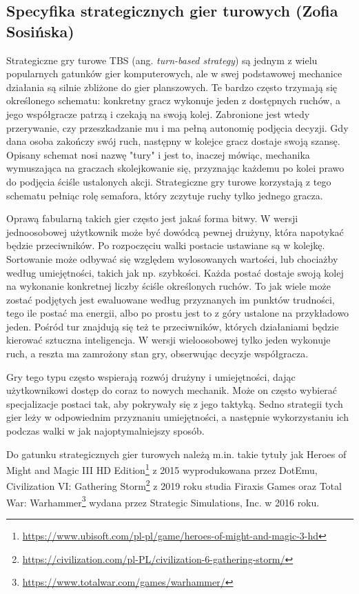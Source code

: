 \subsection{Specyfika strategicznych gier turowych (Zofia Sosińska)}\label{ss:tbs}
Strategiczne gry turowe TBS (ang. \textit{turn-based strategy}) są jednym z wielu popularnych gatunków gier komputerowych, ale w swej podstawowej mechanice działania są silnie zbliżone do
gier planszowych. Te bardzo często trzymają się określonego schematu: konkretny gracz wykonuje jeden z dostępnych ruchów, a jego współgracze patrzą i czekają 
na swoją kolej. Zabronione jest wtedy przerywanie, czy przeszkadzanie mu i ma pełną autonomię podjęcia decyzji. Gdy dana osoba zakończy swój ruch, następny w kolejce gracz
dostaje swoją szansę. Opisany schemat nosi nazwę "tury" i jest to, inaczej mówiąc, mechanika wymuszająca na graczach skolejkowanie się, przyznając każdemu po kolei
prawo do podjęcia ściśle ustalonych akcji. Strategiczne gry turowe korzystają z tego schematu pełniąc rolę semafora, który zczytuje ruchy tylko jednego gracza.

Oprawą fabularną takich gier często jest jakaś forma bitwy. W wersji jednoosobowej użytkownik może być dowódcą pewnej drużyny, która napotykać będzie przeciwników. Po 
rozpoczęciu walki postacie ustawiane są w kolejkę. Sortowanie może odbywać się względem wylosowanych wartości, lub chociażby według umiejętności, takich jak np. szybkości. Każda postać
 dostaje swoją kolej na wykonanie konkretnej liczby ściśle określonych ruchów. To jak wiele może zostać podjętych jest ewaluowane według przyznanych im punktów 
 trudności, tego ile postać ma energii, albo po prostu jest to z góry ustalone na przykładowo jeden. Pośród tur znajdują się też te przeciwników, których działaniami będzie 
 kierować sztuczna inteligencja. W wersji wieloosobowej tylko jeden wykonuje ruch, a reszta ma zamrożony stan gry, obserwując decyzje współgracza.

Gry tego typu często wspierają rozwój drużyny i umiejętności, dając użytkownikowi dostęp do coraz to nowych mechanik. Może on często wybierać specjalizacje postaci tak, aby 
pokrywały się z jego taktyką. Sedno strategii tych gier leży w odpowiednim przyznaniu umiejętności, a następnie wykorzystaniu ich podczas walki w jak najoptymalniejszy sposób.

Do gatunku strategicznych gier turowych należą m.in. takie tytuły jak Heroes of Might and Magic III HD Edition\footnote{\url{https://www.ubisoft.com/pl-pl/game/heroes-of-might-and-magic-3-hd}} z 2015 wyprodukowana przez DotEmu, 
Civilization VI: Gathering Storm\footnote{\url{https://civilization.com/pl-PL/civilization-6-gathering-storm/}} z 2019 roku studia Firaxis Games oraz Total War: Warhammer\footnote{\url{https://www.totalwar.com/games/warhammer/}} wydana przez Strategic Simulations, Inc. w 2016 roku.
